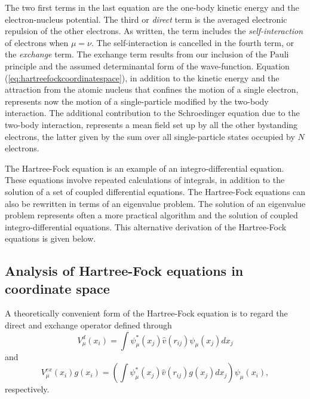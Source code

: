 \documentclass[%
oneside,                 %
final,                   %
10pt]{article}
\begin{document}
The two first terms in the last equation are the one-body kinetic energy and the
electron-nucleus potential. The third or \emph{direct} term is the averaged electronic repulsion of the other
electrons. As written, the
term includes the \emph{self-interaction} of 
electrons when $\mu=\nu$. The self-interaction is cancelled in the fourth
term, or the \emph{exchange} term. The exchange term results from our
inclusion of the Pauli principle and the assumed determinantal form of
the wave-function. Equation (\ref{eq:hartreefockcoordinatespace}), in addition to the kinetic energy and the attraction from the atomic nucleus that confines the motion of a single electron,   represents now the motion of a single-particle modified by the two-body interaction. The additional contribution to the Schroedinger equation due to the two-body interaction, represents a mean field set up by all the other bystanding electrons, the latter given by the sum over all single-particle states occupied by $N$ electrons. 

The Hartree-Fock equation is an example of an integro-differential equation. These equations involve repeated calculations of integrals, in addition to the solution of a set of coupled differential equations. 
The Hartree-Fock equations can also be rewritten in terms of an eigenvalue problem. The solution of an eigenvalue problem represents often a more practical algorithm and the  solution of  coupled  integro-differential equations.
This alternative derivation of the Hartree-Fock equations is given below.




\subsection{Analysis of Hartree-Fock equations in coordinate space}

  A theoretically convenient form of the
Hartree-Fock equation is to regard the direct and exchange operator
defined through 
\begin{equation*}
  V_{\mu}^{d}(x_i) = \int \psi_{\mu}^*(x_j) 
 \hat{v}(r_{ij})\psi_{\mu}(x_j) dx_j
\end{equation*}
and
\begin{equation*}
  V_{\mu}^{ex}(x_i) g(x_i) 
  = \left(\int \psi_{\mu}^*(x_j) 
 \hat{v}(r_{ij})g(x_j) dx_j
  \right)\psi_{\mu}(x_i),
\end{equation*}
respectively. 
\end{document}

